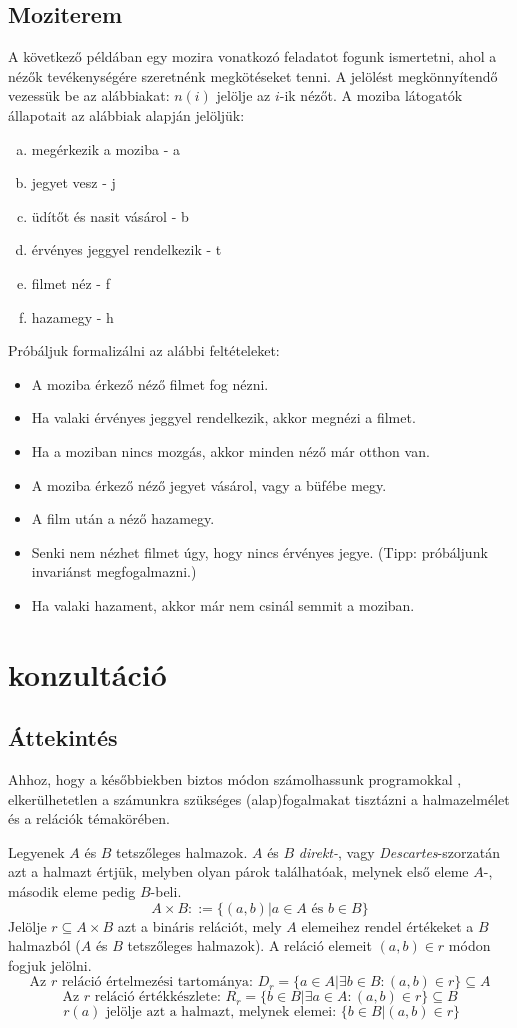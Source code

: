 \documentclass[12pt]{article}
\begin{document}
\subsection{Moziterem}\label{moziterem-feladat}
	A következő példában egy mozira vonatkozó feladatot fogunk ismertetni, ahol a nézők tevékenységére szeretnénk megkötéseket tenni. A jelölést megkönnyítendő vezessük be az alábbiakat: $n(i)$ jelölje az $i$-ik nézőt. A moziba látogatók állapotait az alábbiak alapján jelöljük:
	\begin{enumerate}[a)]
		\item megérkezik a moziba - a
		\item jegyet vesz - j
		\item üdítőt és nasit vásárol - b
		\item érvényes jeggyel rendelkezik - t
		\item filmet néz - f
		\item hazamegy - h
	\end{enumerate}
	Próbáljuk formalizálni az alábbi feltételeket:
	\begin{itemize}
		\item A moziba érkező néző filmet fog nézni.
		\item Ha valaki érvényes jeggyel rendelkezik, akkor megnézi a filmet.
		\item Ha a moziban nincs mozgás, akkor minden néző már otthon van.
		\item A moziba érkező néző jegyet vásárol, vagy a büfébe megy.
		\item A film után a néző hazamegy.
		\item Senki nem nézhet filmet úgy, hogy nincs érvényes jegye. (Tipp: próbáljunk invariánst megfogalmazni.)
		\item Ha valaki hazament, akkor már nem csinál semmit a moziban.
	\end{itemize}

\newpage
\section{konzultáció}
\subsection{Áttekintés}
Ahhoz, hogy a későbbiekben biztos módon számolhassunk programokkal , elkerülhetetlen a számunkra szükséges (alap)fogalmakat tisztázni a halmazelmélet és a relációk témakörében.

Legyenek $A$ és $B$ tetszőleges halmazok. $A$ és $B$ \textit{direkt-}, vagy \textit{Descartes}-szorzatán azt a halmazt értjük, melyben olyan párok találhatóak, melynek első eleme $A$-, második eleme pedig $B$-beli.
$$A \times B ::= \{ (a,b) | a \in A \text{ és } b \in B \}$$
Jelölje $r \subseteq A \times B$ azt a bináris relációt, mely $A$ elemeihez rendel értékeket a $B$ halmazból ($A$ és $B$ tetszőleges halmazok). A reláció elemeit $(a,b) \in r $ módon fogjuk jelölni.
$$ \text{Az } r \text{ reláció értelmezési tartománya: } D_r = \{a \in A | \exists b \in B: (a,b) \in r \} \subseteq A$$
$$ \text{Az } r \text{ reláció értékkészlete: } R_r = \{b \in B | \exists a \in A: (a,b) \in r \} \subseteq B$$
$$\ r(a) \text{ jelölje azt a halmazt, melynek elemei: } \{b \in B | (a,b) \in r \} $$
\end{document}
